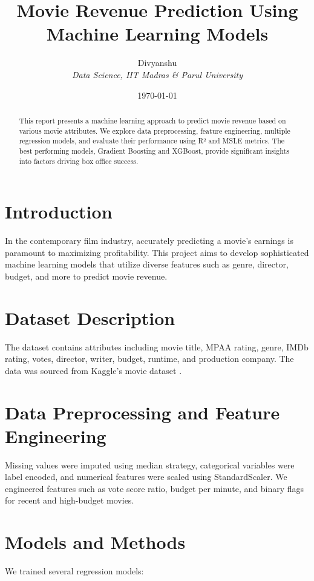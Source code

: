 \documentclass[a4paper,12pt]{article}
\title{Movie Revenue Prediction Using Machine Learning Models}
\author{Divyanshu\\
\textit{Data Science, IIT Madras \& Parul University}}
\date{\today}
\begin{document}
\maketitle

\begin{abstract}
This report presents a machine learning approach to predict movie revenue based on various movie attributes. We explore data preprocessing, feature engineering, multiple regression models, and evaluate their performance using R² and MSLE metrics. The best performing models, Gradient Boosting and XGBoost, provide significant insights into factors driving box office success.
\end{abstract}

\section{Introduction}

In the contemporary film industry, accurately predicting a movie's earnings is paramount to maximizing profitability. This project aims to develop sophisticated machine learning models that utilize diverse features such as genre, director, budget, and more to predict movie revenue.

\section{Dataset Description}

The dataset contains attributes including movie title, MPAA rating, genre, IMDb rating, votes, director, writer, budget, runtime, and production company. The data was sourced from Kaggle's movie dataset \cite{grijalva_kaggle}.

\section{Data Preprocessing and Feature Engineering}

Missing values were imputed using median strategy, categorical variables were label encoded, and numerical features were scaled using StandardScaler. We engineered features such as vote score ratio, budget per minute, and binary flags for recent and high-budget movies.

\section{Models and Methods}

We trained several regression models:
\end{document}
